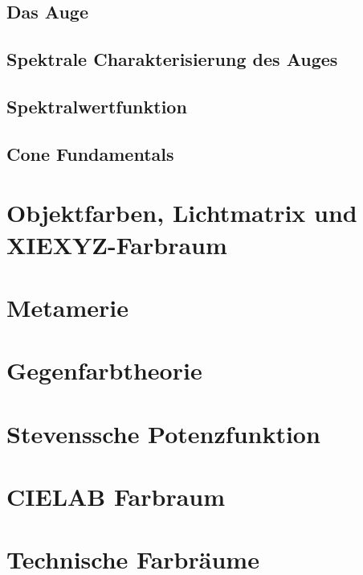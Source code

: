 \documentclass[a4paper, 11pt, accentcolor = tud3b]{tudreport}
\begin{document}
			\subsection{Das Auge} %

			\subsection{Spektrale Charakterisierung des Auges} %

			\subsection{Spektralwertfunktion} %

			\subsection{Cone Fundamentals} %

		\section{Objektfarben, Lichtmatrix und XIEXYZ-Farbraum} %

		\section{Metamerie} %

		\section{Gegenfarbtheorie} %

		\section{Stevenssche Potenzfunktion} %

		\section{CIELAB Farbraum} %

		\section{Technische Farbräume} %
\end{document}
